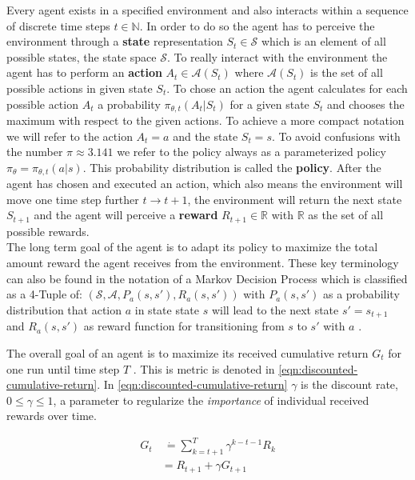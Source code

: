 Every agent exists in a specified environment and also interacts within a sequence of discrete time steps $t \in \mathbb{N}$. In order to do so the agent has to perceive the environment through a \textbf{state} representation $S_t \in \mathcal{S}$ which is an element of all possible states, the state space $\mathcal{S}$. To really interact with the environment the agent has to perform an \textbf{action} $A_t \in \mathcal{A}(S_t)$ where $\mathcal{A}(S_t)$ is the set of all possible actions in given state $S_t$. To chose an action the agent calculates for each possible action $A_t$ a probability $\pi_{\theta, t}(A_t|S_t)$ for a given state $S_t$ and chooses the maximum with respect to the given actions. To achieve a more compact notation we will refer to the action $A_t = a$ and the state $S_t = s$. To avoid confusions with the number $\pi \approx 3.141$ we refer to the policy always as a parameterized policy $\pi_\theta = \pi_{\theta, t}(a|s)$.  
This probability distribution is called the \textbf{policy}. 
After the agent has chosen and executed an action, which also means the environment will move one time step further $t \to t + 1$, the environment will return the next state $S_{t+1}$ and the agent will perceive a \textbf{reward} $R_{t+1} \in \mathbb{R}$ with $\mathbb{R}$ as the set of all possible rewards.\\
The long term goal of the agent is to adapt its policy to maximize the total amount reward the agent receives from the environment.
These key terminology can also be found in the notation of a Markov Decision Process which is classified as a 4-Tuple of: $(\mathcal{S}, \mathcal{A}, P_a(s, s'), R_a(s, s'))$ with $ P_a(s, s')$ as a probability distribution that action $a$ in state state $s$ will lead to the next state $s' = s_{t+1}$ and $ R_a(s, s')$ as reward function for transitioning from $s$ to $s'$ with $a$ \cite{SuttonBartoRLBook}.

The overall goal of an agent is to maximize its received cumulative return $G_t$ for one run until time step $T$ \cite{SuttonBartoRLBook}. This is metric is denoted in \eqref{eqn:discounted-cumulative-return}. In \eqref{eqn:discounted-cumulative-return} $\gamma$ is the discount rate, $0 \leq \gamma \leq 1$, a parameter to regularize the \textit{importance} of individual received rewards over time. 

\begin{align}
	G_t & \ \dot{=} \sum_{k=t+1}^T \gamma^{k-t-1}R_k \label{eqn:discounted-cumulative-return} \\
	&= R_{t+1} + \gamma G_{t+1} \label{eqn:discounted-cumulative-return-recursive}
\end{align}

